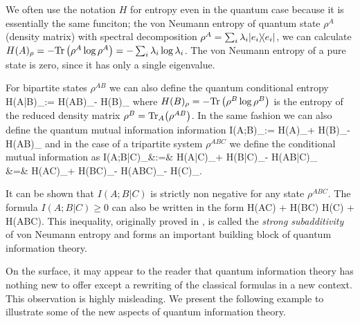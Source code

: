 \documentclass[aps,11pt,twoside,letterpaper]{article}
\def\Tr{\textup{Tr}}
\begin{document}
            We often use the notation $H$ for entropy even in the quantum case because it is essentially
            the same funciton; the von Neumann entropy of quantum state $\rho^A$ (density matrix) 
            with spectral decomposition $\rho^A = \sum_i \lambda_i | e_i \rangle\!\langle e_i |$, we 
			can calculate $H(A)_\rho=-\Tr\left(\rho^A\log\rho^A\right) = - \sum_i \lambda_i \log \lambda_i$.
			The von Neumann entropy of a pure state is zero, since it has only a single eigenvalue.

			
			For bipartite states $\rho^{AB}$ we can also define the quantum conditional entropy
			\be
				H(A|B)_\rho 	:= 		H(AB)_\rho - H(B)_\rho					\label{cond-entrpy} 
			\ee
			where $H(B)_\rho = -\Tr\left(\rho^B\log\rho^B\right)$ is the entropy of the reduced density matrix
			$\rho^B = \Tr_A\!\left( \rho^{AB}\right)$. In the same fashion we can also define the 
			quantum mutual information information
			\be
				I(A;B)_\rho 	:=		H(A)_\rho + H(B)_\rho - H(AB)_\rho 
			\ee
			and in the case of a tripartite system $\rho^{ABC}$ we define the conditional mutual information 
			as 
			\bea
				I(A;B|C)_\rho 	&:=&	H(A|C)_\rho + H(B|C)_\rho - H(AB|C)_\rho \label{cond-mut-info} \\
								&=&		H(AC)_\rho + H(BC)_\rho - H(ABC)_\rho - H(C)_\rho.
			\eea
		    
			\noindent It can be shown that $I(A;B|C)$ is strictly non negative for any state $\rho^{ABC}$.
			The formula $I(A;B|C)\geq 0$ can also be written in the form
			\be	\label{strong-subadditivity}
				H(AC) + H(BC) 	\geq	H(C) + H(ABC).
			\ee
			This inequality, originally proved in \cite{LR73}, is called the \emph{strong subadditivity} of von Neumann 
			entropy and forms an important building block of quantum information theory.
			
			
			On the surface, it may appear to the reader that quantum information theory has nothing new to offer except 
			a rewriting of the classical formulas in a new context.
			This observation is highly misleading.
			We present the following example to illustrate some of the new aspects of quantum information theory.
			
\end{document}
